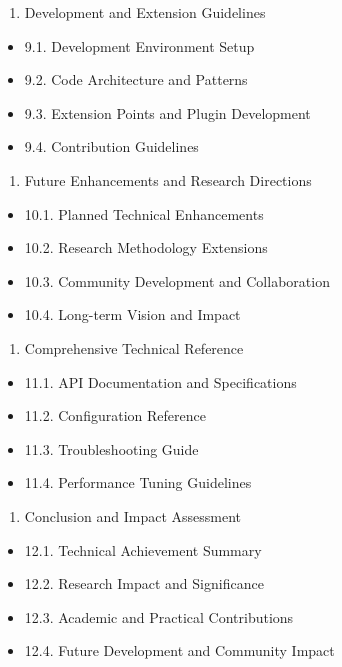 \documentclass[11pt,a4paper]{article}
\begin{document}
\begin{enumerate}
\item Development and Extension Guidelines
\end{enumerate}
\begin{itemize}
\item 9.1. Development Environment Setup
\item 9.2. Code Architecture and Patterns
\item 9.3. Extension Points and Plugin Development
\item 9.4. Contribution Guidelines

\end{itemize}
\begin{enumerate}
\item Future Enhancements and Research Directions
\end{enumerate}
\begin{itemize}
\item 10.1. Planned Technical Enhancements
\item 10.2. Research Methodology Extensions
\item 10.3. Community Development and Collaboration
\item 10.4. Long-term Vision and Impact

\end{itemize}
\begin{enumerate}
\item Comprehensive Technical Reference
\end{enumerate}
\begin{itemize}
\item 11.1. API Documentation and Specifications
\item 11.2. Configuration Reference
\item 11.3. Troubleshooting Guide
\item 11.4. Performance Tuning Guidelines

\end{itemize}
\begin{enumerate}
\item Conclusion and Impact Assessment
\end{enumerate}
\begin{itemize}
\item 12.1. Technical Achievement Summary
\item 12.2. Research Impact and Significance
\item 12.3. Academic and Practical Contributions
\item 12.4. Future Development and Community Impact

\end{itemize}
\end{document}
